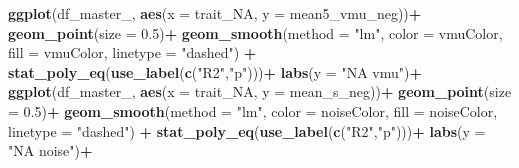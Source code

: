 \documentclass[
]{article}
\newenvironment{Shaded}{\begin{snugshade}}{\end{snugshade}}
\newcommand{\AttributeTok}[1]{\textcolor[rgb]{0.13,0.29,0.53}{#1}}
\newcommand{\FloatTok}[1]{\textcolor[rgb]{0.00,0.00,0.81}{#1}}
\newcommand{\FunctionTok}[1]{\textcolor[rgb]{0.13,0.29,0.53}{\textbf{#1}}}
\newcommand{\NormalTok}[1]{#1}
\newcommand{\SpecialCharTok}[1]{\textcolor[rgb]{0.81,0.36,0.00}{\textbf{#1}}}
\newcommand{\StringTok}[1]{\textcolor[rgb]{0.31,0.60,0.02}{#1}}
\begin{document}
\begin{Shaded}
\begin{Highlighting}[]
\FunctionTok{ggplot}\NormalTok{(df\_master\_, }\FunctionTok{aes}\NormalTok{(}\AttributeTok{x =}\NormalTok{ trait\_NA, }\AttributeTok{y =}\NormalTok{ mean5\_vmu\_neg))}\SpecialCharTok{+}
  \FunctionTok{geom\_point}\NormalTok{(}\AttributeTok{size =} \FloatTok{0.5}\NormalTok{)}\SpecialCharTok{+}
  \FunctionTok{geom\_smooth}\NormalTok{(}\AttributeTok{method =} \StringTok{"lm"}\NormalTok{, }\AttributeTok{color =}\NormalTok{ vmuColor, }\AttributeTok{fill =}\NormalTok{ vmuColor, }\AttributeTok{linetype =} \StringTok{"dashed"}\NormalTok{) }\SpecialCharTok{+}
  \FunctionTok{stat\_poly\_eq}\NormalTok{(}\FunctionTok{use\_label}\NormalTok{(}\FunctionTok{c}\NormalTok{(}\StringTok{"R2"}\NormalTok{,}\StringTok{"p"}\NormalTok{)))}\SpecialCharTok{+}
  \FunctionTok{labs}\NormalTok{(}\AttributeTok{y =} \StringTok{"NA vmu"}\NormalTok{)}\SpecialCharTok{+}
\FunctionTok{ggplot}\NormalTok{(df\_master\_, }\FunctionTok{aes}\NormalTok{(}\AttributeTok{x =}\NormalTok{ trait\_NA, }\AttributeTok{y =}\NormalTok{ mean\_s\_neg))}\SpecialCharTok{+}
  \FunctionTok{geom\_point}\NormalTok{(}\AttributeTok{size =} \FloatTok{0.5}\NormalTok{)}\SpecialCharTok{+}
  \FunctionTok{geom\_smooth}\NormalTok{(}\AttributeTok{method =} \StringTok{"lm"}\NormalTok{, }\AttributeTok{color =}\NormalTok{ noiseColor, }\AttributeTok{fill =}\NormalTok{ noiseColor, }\AttributeTok{linetype =} \StringTok{"dashed"}\NormalTok{) }\SpecialCharTok{+}
  \FunctionTok{stat\_poly\_eq}\NormalTok{(}\FunctionTok{use\_label}\NormalTok{(}\FunctionTok{c}\NormalTok{(}\StringTok{"R2"}\NormalTok{,}\StringTok{"p"}\NormalTok{)))}\SpecialCharTok{+}
  \FunctionTok{labs}\NormalTok{(}\AttributeTok{y =} \StringTok{"NA noise"}\NormalTok{)}\SpecialCharTok{+}


\end{Highlighting}
\end{Shaded}
\end{document}
